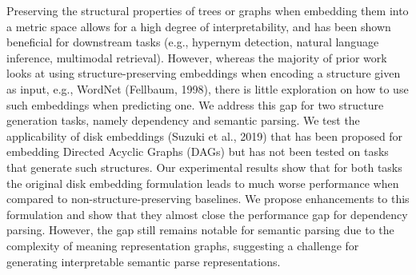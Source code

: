 Preserving the structural properties of trees or graphs when embedding them into a metric space allows for a high degree of interpretability, and has been shown beneficial for downstream tasks (e.g., hypernym detection, natural language inference, multimodal retrieval). However, whereas the majority of prior work looks at using structure-preserving embeddings when encoding a structure given as input, e.g., WordNet (Fellbaum, 1998), there is little exploration on how to use such embeddings when predicting one. We address this gap for two structure generation tasks, namely dependency and semantic parsing. We test the applicability of disk embeddings (Suzuki et al., 2019) that has been proposed for embedding Directed Acyclic Graphs (DAGs) but has not been tested on tasks that generate such structures. Our experimental results show that for both tasks the original disk embedding formulation leads to much worse performance when compared to non-structure-preserving baselines. We propose enhancements to this formulation and show that they almost close the performance gap for dependency parsing. However, the gap still remains notable for semantic parsing due to the complexity of meaning representation graphs, suggesting a challenge for generating interpretable semantic parse representations.
